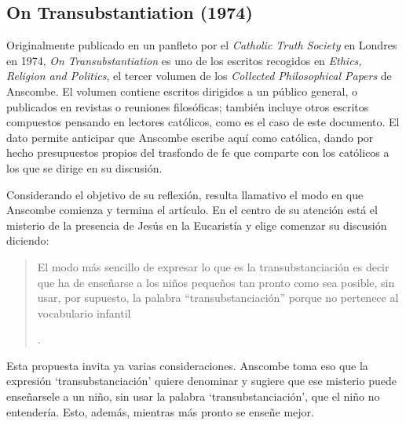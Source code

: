 \subsection{On Transubstantiation (1974)}

Originalmente publicado en un panfleto por el \emph{Catholic Truth Society} en Londres en 1974, \emph{On Transubstantiation} es uno de los escritos recogidos en \emph{Ethics, Religion and Politics}, el tercer volumen de los \emph{Collected Philosophical Papers} de Anscombe. El volumen contiene escritos dirigidos a un público general, o publicados en revistas o reuniones filosóficas; también incluye otros escritos compuestos pensando en lectores católicos, como es el caso de este documento. El dato permite anticipar que Anscombe escribe aquí como católica, dando por hecho presupuestos propios del trasfondo de fe que comparte con los católicos a los que se dirige en su discusión.

Considerando el objetivo de su reflexión, resulta llamativo el modo en que Anscombe comienza y termina el artículo. En el centro de su atención está el misterio de la presencia de Jesús en la Eucaristía y elige comenzar su discusión diciendo: \blockquote[{\Cite[85]{torralbaynubiola2005fayeh:ot}}.
]{El modo más sencillo de expresar lo que es la transubstanciación es decir que ha de enseñarse a los niños pequeños tan pronto como sea posible, sin usar, por supuesto, la palabra ``transubstanciación'' porque no pertenece al vocabulario infantil}. Esta propuesta invita ya varias consideraciones. Anscombe toma eso que la expresión `transubstanciación' quiere denominar y sugiere que ese misterio puede enseñarsele a un niño, sin usar la palabra `transubstanciación', que el niño no entendería. Esto, además, mientras más pronto se enseñe mejor.

